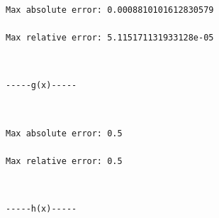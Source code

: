 \documentclass[11pt]{article}
\begin{document}
    \begin{Verbatim}[commandchars=\\\{\}]
Max absolute error: 0.0008810101612830579

Max relative error: 5.115171131933128e-05

    \end{Verbatim}

    \begin{center}
    \end{center}
    { \hspace*{\fill} \\}
    
    \begin{Verbatim}[commandchars=\\\{\}]
-----g(x)-----
    \end{Verbatim}

    \begin{center}
    \end{center}
    { \hspace*{\fill} \\}
    
    \begin{Verbatim}[commandchars=\\\{\}]
Max absolute error: 0.5

Max relative error: 0.5

    \end{Verbatim}

    \begin{center}
    \end{center}
    { \hspace*{\fill} \\}
    
    \begin{Verbatim}[commandchars=\\\{\}]
-----h(x)-----
    \end{Verbatim}

    \begin{center}
    \end{center}
    { \hspace*{\fill} \\}
    
\end{document}
